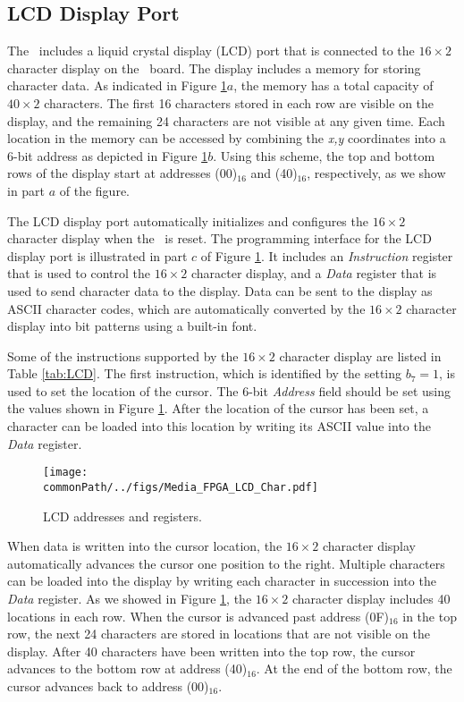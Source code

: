 \subsection{LCD Display Port}

The \systemName~includes a liquid crystal display (LCD) port 
that is connected to the $16\times2$
character display on the \DEBoard~board. The display includes a memory for storing character
data. As indicated in Figure \ref{fig:LCD}$a$, the memory has a total capacity of
$40\times2$ characters. The first 16 characters stored in each row are visible on the
display, and the remaining 24 characters are not visible at any given time. Each location
in the memory can be accessed by combining the {\it x,y} coordinates into a 6-bit address
as depicted in Figure \ref{fig:LCD}$b$.  Using this scheme, the top and bottom rows of the 
display start at addresses (00)$_{16}$ and (40)$_{16}$, respectively, as we show in 
part $a$ of the figure.

The LCD display port automatically initializes and configures the $16\times2$ 
character display when the \systemName~is reset.
The programming interface for the LCD display port is illustrated in part $c$ of 
Figure \ref{fig:LCD}.  It includes an {\it Instruction} register that is used to control
the $16 \times 2$ character display, 
and a {\it Data} register that is used to send character data to the 
display. Data can be sent to the display as ASCII character codes, which are automatically 
converted by the $16 \times 2$ character display into bit patterns using a built-in font.

Some of the instructions supported by the $16 \times 2$ character
display are listed in Table \ref{tab:LCD}.
The first instruction, which is identified by the setting $b_7=1$, is used to set the location
of the cursor. The 6-bit {\it Address} field should be set using the values shown in
Figure \ref{fig:LCD}.  After the location of the cursor has been set, a character can 
be loaded into this location by writing its ASCII value into the {\it Data} register. 

\begin{figure}[h!]
   \begin{center}
       \texttt{[image: \\commonPath/../figs/Media\_FPGA\_LCD\_Char.pdf]}
   \end{center}
   \caption{LCD addresses and registers.}
	\label{fig:LCD}
\end{figure}

When data is written into the cursor location, the $16 \times 2$ character display 
automatically advances the cursor one position to the right. Multiple characters can 
be loaded into the display by writing each character in succession into the {\it Data} 
register. As we showed in Figure \ref{fig:LCD}, the $16 \times 2$ character display 
includes 40 locations in each row. When the cursor is
advanced past address (0F)$_{16}$ in the top row, the next 24 characters are stored in locations
that are not visible on the display. After 40 characters have been written into the top
row, the cursor advances to the bottom row at address (40)$_{16}$. At the end of the bottom row,
the cursor advances back to address (00)$_{16}$.

